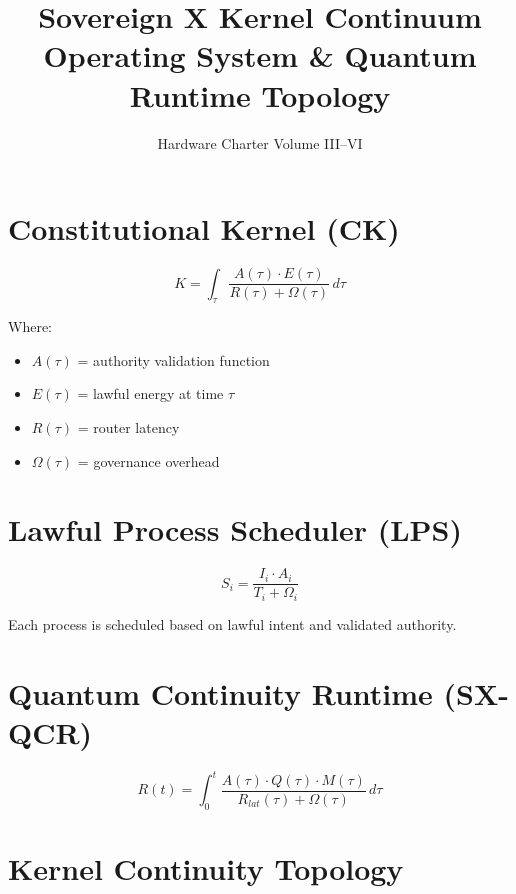 \documentclass[10pt,a4paper]{article}
\title{Sovereign X Kernel Continuum \\ Operating System \& Quantum Runtime Topology}
\author{Hardware Charter Volume III–VI}
\date{}
\begin{document}
\maketitle

\section{Constitutional Kernel (CK)}

\[
K = \int_{\tau} \frac{A(\tau) \cdot E(\tau)}{R(\tau) + \Omega(\tau)} \, d\tau
\]

Where:
\begin{itemize}
  \item \(A(\tau)\) = authority validation function
  \item \(E(\tau)\) = lawful energy at time \(\tau\)
  \item \(R(\tau)\) = router latency
  \item \(\Omega(\tau)\) = governance overhead
\end{itemize}

\section{Lawful Process Scheduler (LPS)}

\[
S_i = \frac{I_i \cdot A_i}{T_i + \Omega_i}
\]

Each process is scheduled based on lawful intent and validated authority.

\section{Quantum Continuity Runtime (SX-QCR)}

\[
R(t) = \int_{0}^{t} \frac{A(\tau) \cdot Q(\tau) \cdot M(\tau)}{R_{lat}(\tau) + \Omega(\tau)} \, d\tau
\]

\section{Kernel Continuity Topology}
\end{document}
